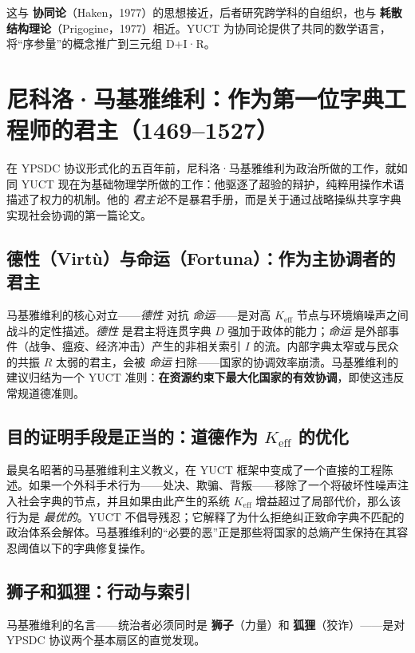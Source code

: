 \documentclass[12pt,a4paper]{article}
\begin{document}
	这与 \textbf{协同论}（Haken，1977）的思想接近，后者研究跨学科的自组织，也与 \textbf{耗散结构理论}（Prigogine，1977）相近。YUCT 为协同论提供了共同的数学语言，将“序参量”的概念推广到三元组 D+I·R。
	
	\section{尼科洛·马基雅维利：作为第一位字典工程师的君主（1469–1527）}
	\label{sec:machiavelli}
	
	在 YPSDC 协议形式化的五百年前，尼科洛·马基雅维利为政治所做的工作，就如同 YUCT 现在为基础物理学所做的工作：他驱逐了超验的辩护，纯粹用操作术语描述了权力的机制。他的 \emph{君主论}不是暴君手册，而是关于通过战略操纵共享字典实现社会协调的第一篇论文。
	
	\subsection{德性（Virtù）与命运（Fortuna）：作为主协调者的君主}
	
	马基雅维利的核心对立——\emph{德性} 对抗 \emph{命运}——是对高 \(K_{\mathrm{eff}}\) 节点与环境熵噪声之间战斗的定性描述。\emph{德性} 是君主将连贯字典 \(D\) 强加于政体的能力；\emph{命运} 是外部事件（战争、瘟疫、经济冲击）产生的非相关索引 \(I\) 的流。内部字典太窄或与民众的共振 \(R\) 太弱的君主，会被 \emph{命运} 扫除——国家的协调效率崩溃。马基雅维利的建议归结为一个 YUCT 准则：\textbf{在资源约束下最大化国家的有效协调}，即使这违反常规道德准则。
	
	\subsection{目的证明手段是正当的：道德作为 \(K_{\mathrm{eff}}\) 的优化}
	
	最臭名昭著的马基雅维利主义教义，在 YUCT 框架中变成了一个直接的工程陈述。如果一个外科手术行为——处决、欺骗、背叛——移除了一个将破坏性噪声注入社会字典的节点，并且如果由此产生的系统 \(K_{\mathrm{eff}}\) 增益超过了局部代价，那么该行为是 \emph{最优的}。YUCT 不倡导残忍；它解释了为什么拒绝纠正致命字典不匹配的政治体系会解体。马基雅维利的“必要的恶”正是那些将国家的总熵产生保持在其容忍阈值以下的字典修复操作。
	
	\subsection{狮子和狐狸：行动与索引}
	
	马基雅维利的名言——统治者必须同时是 \textbf{狮子}（力量）和 \textbf{狐狸}（狡诈）——是对 YPSDC 协议两个基本扇区的直觉发现。
	
\end{document}
